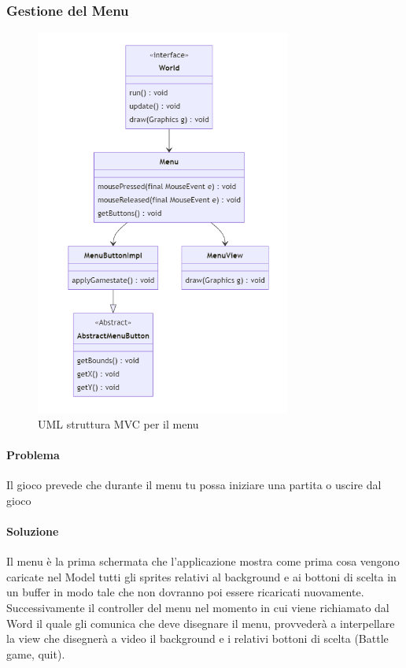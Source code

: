 \documentclass[a4paper,12pt]{report}
\begin{document}
\subsubsection{Gestione del Menu}

\begin{figure}[H]
    \centering{}
    \includegraphics[width=0.75\textwidth]{img/UMLGestioneMenu.png}
    \caption{UML struttura MVC per il menu}
\end{figure}

\paragraph{Problema} Il gioco prevede che durante il menu tu possa iniziare una partita o uscire dal gioco

\paragraph{Soluzione} Il menu è la prima schermata che l’applicazione mostra come prima cosa vengono caricate nel Model tutti gli sprites relativi al background e ai bottoni di scelta in un buffer in modo tale che non dovranno poi essere ricaricati nuovamente. Successivamente il controller del menu nel momento in cui viene richiamato dal Word il quale gli comunica che deve disegnare il menu, provvederà a interpellare la view che disegnerà a video il background e i relativi bottoni di scelta (Battle game, quit).
\end{document}

